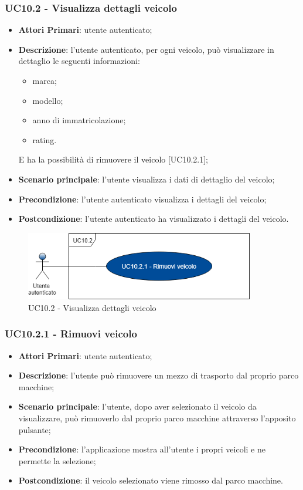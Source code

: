 \subsubsection{UC10.2 - Visualizza dettagli veicolo}
\begin{itemize}
	\item \textbf{Attori Primari}: utente autenticato;
	\item \textbf{Descrizione}: l'utente autenticato, per ogni veicolo, può visualizzare in dettaglio le seguenti informazioni:
	\begin{itemize}
		\item marca;
		\item modello;
		\item anno di immatricolazione;
		\item rating.
	\end{itemize}
	E ha la possibilità di rimuovere il veicolo [UC10.2.1];
	\item \textbf{Scenario principale}: l'utente visualizza i dati di dettaglio del veicolo;
	\item \textbf{Precondizione}: l'utente autenticato visualizza i dettagli del veicolo;
	\item \textbf{Postcondizione}: l'utente autenticato ha visualizzato i dettagli del veicolo.
\end{itemize}
\begin{figure}[H]
	\includegraphics[width=10cm]{res/images/UC10-2Dettagliveicolo.png}
	\centering
	\caption{UC10.2 - Visualizza dettagli veicolo}
\end{figure}

\subsubsection{UC10.2.1 - Rimuovi veicolo}
\begin{itemize}
	\item \textbf{Attori Primari}: utente autenticato;
	\item \textbf{Descrizione}: l'utente può rimuovere un mezzo di trasporto dal proprio parco macchine;
	\item \textbf{Scenario principale}: l'utente, dopo aver selezionato il veicolo da visualizzare, può rimuoverlo dal proprio parco macchine attraverso l'apposito pulsante;
	\item \textbf{Precondizione}: l'applicazione mostra all'utente i propri veicoli e ne permette la selezione;
	\item \textbf{Postcondizione}: il veicolo selezionato viene rimosso dal parco macchine.
\end{itemize}